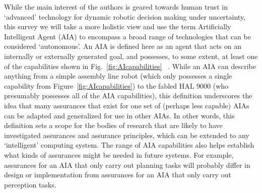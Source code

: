 
    While the main interest of the authors is geared towards human trust in `advanced' technology for dynamic robotic decision making under uncertainty, this survey we will take a more holistic view and use the term Artificially Intelligent Agent (AIA) to encompass a broad range of technologies that can be considered `autonomous'. 
    An AIA is defined here as an agent that acts on an internally or externally generated goal, and possesses, to some extent, at least one of the capabilities shown in Fig.~\ref{fig:AIcapabilities} ~\cite{Russell2010-wv,Nilsson2009-rp,Luger2008-vf}. 
    While an AIA can describe anything from a simple assembly line robot (which only possesses a single capability from Figure~\ref{fig:AIcapabilities}) to the fabled HAL 9000 (who presumably possesses all of the AIA capabilities), this definition underscores the idea that many assurances that exist for one set of (perhaps less capable) AIAs can be adapted and generalized for use in other AIAs.
    In other words, this definition sets a scope for the bodies of research that are likely to have investigated assurances and assurance principles, which can be extended to any `intelligent' computing system. 
    The range of AIA capabilities also helps establish what kinds of assurances might be needed in future systems. 
    For example, assurances for an AIA that only carry out planning tasks will probably differ in design or implementation from assurances for an AIA that only carry out perception tasks. 
    
    
